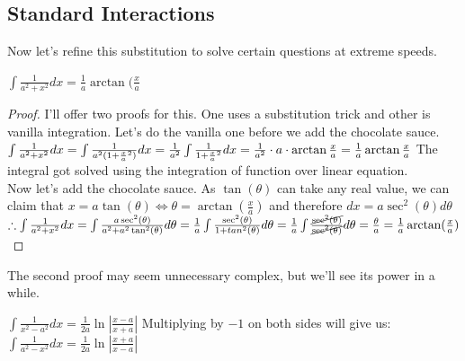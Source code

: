 \subsection{Standard Interactions}
Now let's refine this substitution to solve certain questions at extreme speeds.\\
\begin{theorem}
    $\int \frac{1}{a^2+x^2} dx = \frac{1}{a} \arctan(\frac{x}{a}$
\end{theorem}
\begin{proof}
    I'll offer two proofs for this. One uses a substitution trick and other is vanilla integration. Let's do the vanilla one before we add the chocolate sauce.\\
    $
    \int \frac{1}{a^2+x^2} dx
    = \int \frac{1}{a^2(1+\frac{x}{a}^2)} dx\\
    = \frac{1}{a^2}\int \frac{1}{1+\frac{x}{a}^2} dx
    = \frac{1}{a^2} \cdot a \cdot \arctan{\frac{x}{a}}
    = \frac{1}{a} \arctan{\frac{x}{a}}
    $
    The integral got solved using the integration of function over linear equation.\\
    Now let's add the chocolate sauce. As $\tan(\theta)$ can take any real value, we can claim that $x=a\tan(\theta) \iff \theta=\arctan(\frac{x}{a})$ and therefore $dx=a\sec^2(\theta)d\theta$\\
    $
    \therefore \int \frac{1}{a^2+x^2} dx\\
    = \int \frac{a\sec^2(\theta)}{a^2+a^2\tan^2(\theta)} d\theta\\
    = \frac{1}{a}\int \frac{\sec^2(\theta)}{1+tan^2(\theta)} d\theta\\
    = \frac{1}{a}\int \frac{\cancel{\sec^2(\theta)}}{\cancel{\sec^2(\theta)}} d\theta\\
    = \frac{\theta}{a}\\
    =\frac{1}{a} \arctan(\frac{x}{a})
    $
\end{proof}
The second proof may seem unnecessary complex, but we'll see its power in a while.\\
\begin{theorem}
     $\int \frac{1}{x^2-a^2} dx = \frac{1}{2a} \ln{|\frac{x-a}{x+a}|}$
     Multiplying by $-1$ on both sides will give us:\\
     $\int \frac{1}{a^2-x^2} dx = \frac{1}{2a} \ln{|\frac{x+a}{x-a}|}$
\end{theorem}
